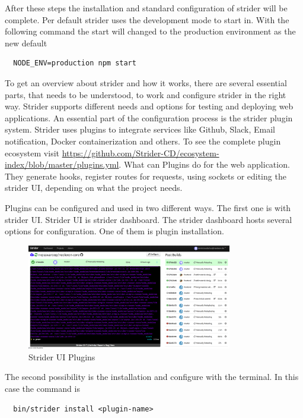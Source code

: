 After these steps the installation and standard configuration of strider will be complete. Per default strider uses the development mode to start in.
With the following command the start will changed to the production environment as the new default

\begin{lstlisting}
  NODE_ENV=production npm start
\end{lstlisting}

To get an overview about strider and how it works, there are several essential parts, that needs to be understood, to work and configure
strider in the right way. Strider supports different needs and options for testing and deploying web applications. An essential part of
the configuration process is the strider plugin system. Strider uses plugins to integrate services like Github, Slack, Email
notification, Docker containerization and others. To see the complete plugin ecosystem visit \url{https://github.com/Strider-CD/ecosystem-index/blob/master/plugins.yml}.
What can Plugins do for the web application. They generate hooks, register routes for requests, using sockets or editing the strider
UI, depending on what the project needs.

Plugins can be configured and used in two different ways. The first one is with strider UI. Strider UI is strider dashboard.
The strider dashboard hosts several options for configuration. One of them is plugin installation.

\begin{figure}[h!]
  \centering
  \includegraphics[width=0.8\textwidth]{images/striderUI.png}
  \caption{Strider UI Plugins}
\end{figure}

The second possibility is the installation and configure with the terminal. In this case the command is

\begin{lstlisting}
  bin/strider install <plugin-name>
\end{lstlisting}

